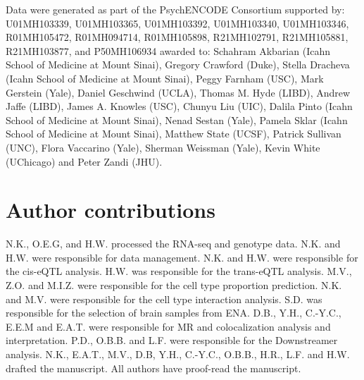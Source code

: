 Data were generated as part of the PsychENCODE Consortium supported by: U01MH103339, U01MH103365, U01MH103392, U01MH103340, U01MH103346, R01MH105472, R01MH094714, R01MH105898, R21MH102791, R21MH105881, R21MH103877, and P50MH106934 awarded to: Schahram Akbarian (Icahn School of Medicine at Mount Sinai), Gregory Crawford (Duke), Stella Dracheva (Icahn School of Medicine at Mount Sinai), Peggy Farnham (USC), Mark Gerstein (Yale), Daniel Geschwind (UCLA), Thomas M. Hyde (LIBD), Andrew Jaffe (LIBD), James A. Knowles (USC), Chunyu Liu (UIC), Dalila Pinto (Icahn School of Medicine at Mount Sinai), Nenad Sestan (Yale), Pamela Sklar (Icahn School of Medicine at Mount Sinai), Matthew State (UCSF), Patrick Sullivan (UNC), Flora Vaccarino (Yale), Sherman Weissman (Yale), Kevin White (UChicago) and Peter Zandi (JHU). 


\section*{Author contributions}

N.K., O.E.G, and H.W. processed the RNA-seq and genotype data. N.K. and H.W. were responsible for data management. N.K. and H.W. were responsible for the cis-eQTL analysis. H.W. was responsible for the trans-eQTL analysis. M.V., Z.O. and M.I.Z. were responsible for the cell type proportion prediction. N.K. and M.V. were responsible for the cell type interaction analysis. S.D. was responsible for the selection of brain samples from ENA. D.B., Y.H., C.-Y.C., E.E.M and E.A.T. were responsible for MR and colocalization analysis and interpretation. P.D., O.B.B. and L.F. were responsible for the Downstreamer analysis. N.K., E.A.T., M.V., D.B, Y.H., C.-Y.C., O.B.B., H.R., L.F. and H.W. drafted the manuscript. All authors have proof-read the manuscript. 



